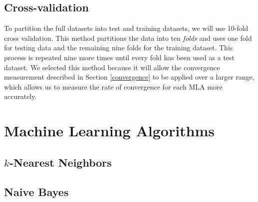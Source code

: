 \documentclass{article}
\begin{document}
		\subsection{Cross-validation}
			\label{cv}
			To partition the full datasets into test and training datasets, we will use 10-fold cross validation. 
			This method partitions the data into ten \textit{folds} and uses one fold for testing data and the remaining nine folds for the training dataset. 
			This process is repeated nine more times until every fold has been used as a test dataset. 
			We selected this method because it will allow the convergence measurement described in Section \ref{convergence} to be applied over a larger range, which allows us to measure the rate of convergence for each MLA more accurately.
	\section{Machine Learning Algorithms}
		\label{mla}
		\subsection{$k$-Nearest Neighbors}
		\subsection{Naive Bayes}
			\label{nbw}
\end{document}
